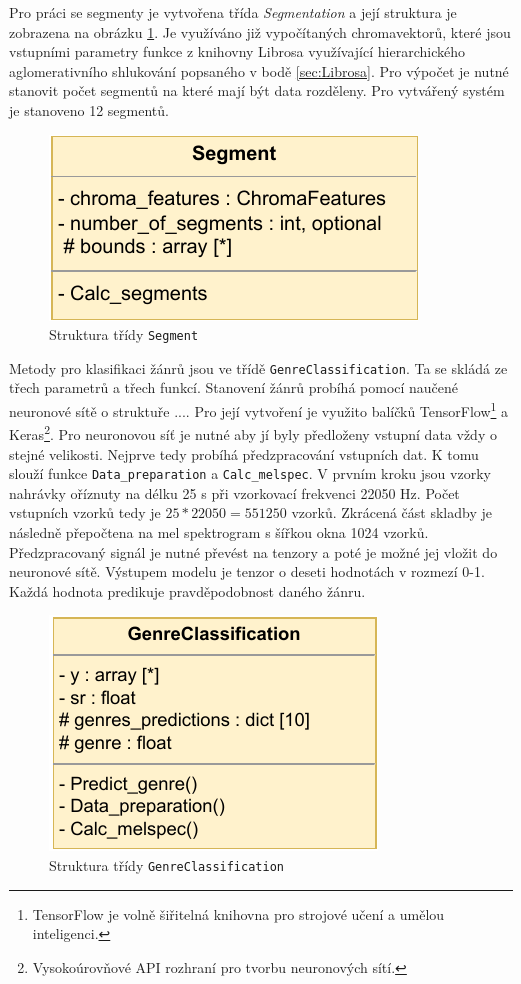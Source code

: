 Pro práci se segmenty je vytvořena třída \textit{Segmentation} a její struktura je zobrazena na obrázku \ref{fig:Segmentation_diagram}. Je využíváno již vypočítaných chromavektorů, které jsou vstupními parametry funkce z knihovny Librosa využívající hierarchického aglomerativního shlukování popsaného v bodě \ref{sec:Librosa}. Pro výpočet je nutné stanovit počet segmentů na které mají být data rozděleny. Pro vytvářený systém je stanoveno 12 segmentů. 


\begin{figure}[H]
    \centering
    \includegraphics[width = 0.3\linewidth]{obrazky/UML_diagram_Segmentation.pdf}
    \caption{Struktura třídy \texttt{Segment}}
    \label{fig:Segmentation_diagram}
\end{figure}

Metody pro klasifikaci žánrů jsou ve třídě \texttt{GenreClassification}. Ta se skládá ze třech parametrů a třech funkcí. Stanovení žánrů probíhá pomocí naučené neuronové sítě o struktuře .... Pro její vytvoření je využito balíčků TensorFlow\footnote{TensorFlow je volně šiřitelná knihovna pro strojové učení a umělou inteligenci.} a Keras\footnote{Vysokoúrovňové API rozhraní pro tvorbu neuronových sítí.}. Pro neuronovou síť je nutné aby jí byly předloženy vstupní data vždy o stejné velikosti. Nejprve tedy probíhá předzpracování vstupních dat. K tomu slouží funkce \texttt{Data\_preparation} a \texttt{Calc\_melspec}. V prvním kroku jsou vzorky nahrávky oříznuty na délku 25 s při vzorkovací frekvenci 22050 Hz. Počet vstupních vzorků tedy je $25 * 22050 = 551250$ vzorků. Zkrácená část skladby je následně přepočtena na mel spektrogram s šířkou okna 1024 vzorků. Předzpracovaný signál je nutné převést na tenzory a poté je možné jej vložit do neuronové sítě. Výstupem modelu je tenzor o deseti hodnotách v rozmezí 0-1. Každá hodnota predikuje pravděpodobnost daného žánru. 

\begin{figure}[H]
    \centering
    \includegraphics[width = 0.3\linewidth]{obrazky/UML_diagramy_GenreClassification.pdf}
    \caption{Struktura třídy \texttt{GenreClassification}}
    \label{fig:GenreClassification_diagram}
\end{figure}


